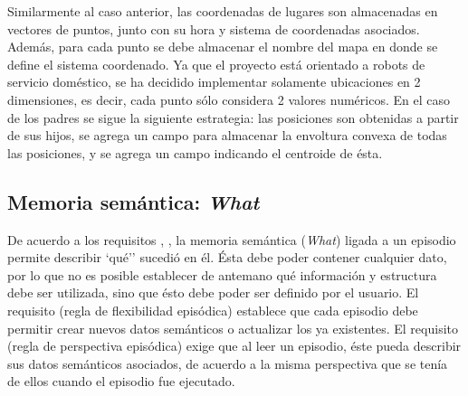 Similarmente al caso anterior, las coordenadas de lugares son almacenadas en vectores de puntos, junto con su hora y sistema de coordenadas asociados. Además, para cada punto se debe almacenar el nombre del mapa en donde se define el sistema coordenado. Ya que el proyecto está orientado a robots de servicio doméstico, se ha decidido implementar solamente ubicaciones en 2 dimensiones, es decir, cada punto sólo considera 2 valores numéricos. En el caso de los padres se sigue la siguiente estrategia: las posiciones son obtenidas a partir de sus hijos, se agrega un campo para almacenar la envoltura convexa de todas las posiciones, y se agrega un campo indicando el centroide de ésta.


\subsection{Memoria semántica: \textit{What}}\label{sec:design_ep_what}

De acuerdo a los requisitos , , la memoria semántica (\textit{What}) ligada a un episodio permite describir `qué'' sucedió en él. Ésta debe poder  contener cualquier dato, por lo que no es posible establecer de antemano qué información y estructura debe ser utilizada, sino que ésto debe poder ser definido por el usuario. El requisito  (regla de flexibilidad episódica) establece que cada episodio debe permitir crear nuevos datos semánticos o actualizar los ya existentes. El requisito  (regla de perspectiva episódica) exige que al leer un episodio, éste pueda describir sus datos semánticos asociados, de acuerdo a la misma perspectiva que se tenía de ellos cuando el episodio fue ejecutado.

